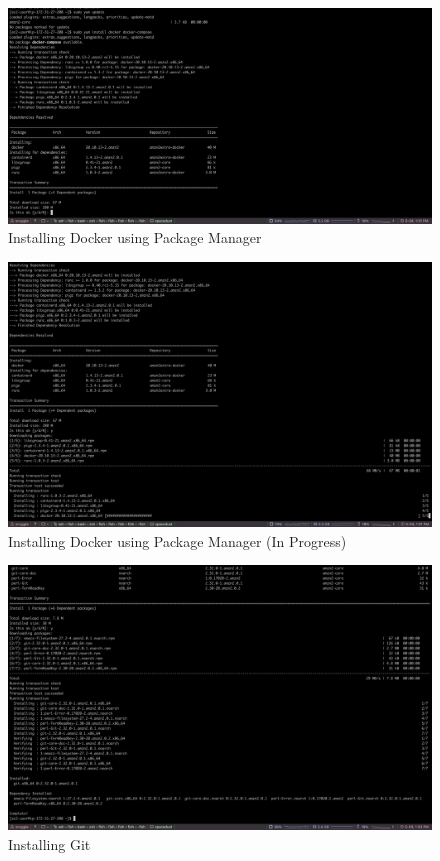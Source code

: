\begin{figure}[H]
    \centering
        \includegraphics[width=\textwidth]{resources/ec2/installing-docker}
    \caption{Installing Docker using Package Manager}
    \label{fig:installing-docker}
\end{figure}

\begin{figure}[H]
    \centering
        \includegraphics[width=\textwidth]{resources/installing-docker-2.png}
    \caption{Installing Docker using Package Manager (In Progress)}
    \label{fig:installing-docker-2}
\end{figure}

\begin{figure}[H]
    \centering
        \includegraphics[width=\textwidth]{resources/installing-docker-3.png}
    \caption{Installing Git}
    \label{fig:installing-docker-3}
\end{figure}

